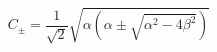 \begin{equation}
C_{\pm}=\frac{1}{\sqrt{2}}\sqrt{\alpha (\alpha \pm
\sqrt{\alpha^{2}-4\beta^{2}})}\label{mas}
\end{equation}

